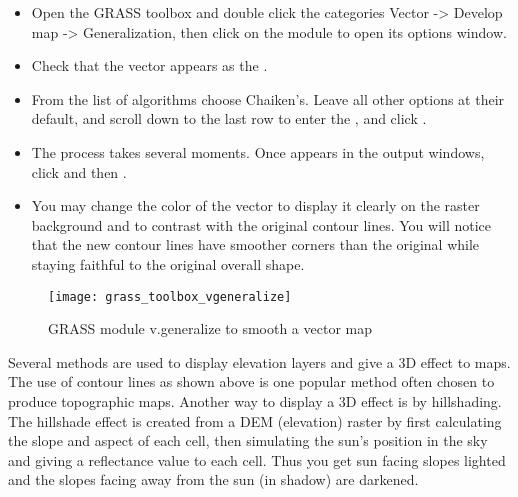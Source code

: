 \begin{itemize}
\item Open the GRASS toolbox and double click the categories Vector ->
Develop map -> Generalization, then click on the 
module to open its options window. 
\item Check that the  vector appears as the
. 
\item From the list of algorithms choose Chaiken's. Leave all other options
at their default, and scroll down to the last row to enter the
, and click
.
\item The process takes several moments. Once  appears in the output windows, click  and then
. 
\item You may change the color of the vector to display it clearly on the
raster background and to contrast with the original contour lines. You will
notice that the new contour lines have smoother corners than the original
while staying faithful to the original overall shape.
\end{itemize}

\begin{figure}[h]
 \begin{center}
 \caption{GRASS module v.generalize to smooth a vector map \nixcaption}\label{fig:grass_toolbox_vgeneralize}
 \texttt{[image: grass\_toolbox\_vgeneralize]}
 \end{center}
\end{figure}

\begin{Tip}\caption{\textsc{Other uses for r.contour}}
\end{Tip}  


Several methods are used to display elevation layers and give a 3D effect to
maps. The use of contour lines as shown above is one popular method often
chosen to produce topographic maps. Another way to display a 3D effect is by
hillshading. The hillshade effect is created from a DEM (elevation) raster by
first calculating the slope and aspect of each cell, then simulating the
sun's position in the sky and giving a reflectance value to each cell. Thus
you get sun facing slopes lighted and the slopes facing away from the sun (in
shadow) are darkened.


